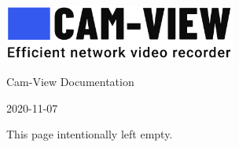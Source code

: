 \def\MyPath{/ home/ idan/ cv/ doc/ cam-view.tex}
\def\MyTitle{Cam-View Documentation}
\def\MyDate{2020-11-07}
\def\PRODUCT{Cam-View}


\clearpage
\pagestyle{empty}
\centerline{\includegraphics[width=3in]{cam-view-large.png}}

\vfill

\centerline{\MyTitle{}}

\vfill

\centerline{\MyDate{}}

\clearpage
\pagestyle{plain}
\setcounter{page}{1}
\tableofcontents

\clearpage
\setcounter{page}{1}








\clearpage
This page intentionally left empty.
\LastPage{}

